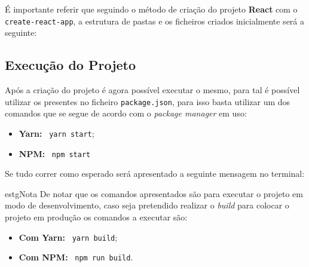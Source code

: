 É importante referir que seguindo o método de criação do projeto \textbf{React} com o \texttt{create-react-app}, a estrutura de pastas e os ficheiros criados inicialmente será a seguinte:



\subsection{Execução do Projeto}

Após a criação do projeto é agora possível executar o mesmo, para tal é possível utilizar os \textit{} presentes no ficheiro \texttt{package.json}, para isso basta utilizar um dos comandos que se segue de acordo com o \textit{package manager} em uso:

\begin{itemize}
	\item \textbf{Yarn:} ~\texttt{yarn start};
	\item \textbf{NPM:} ~\texttt{npm start}
\end{itemize}

Se tudo correr como esperado será apresentado a seguinte mensagem no terminal:


\begin{mybox}{estg}{Nota}
	De notar que os comandos apresentados são para executar o projeto em modo de desenvolvimento, caso seja pretendido realizar o \textit{build} para colocar o projeto em produção os comandos a executar são:

	\begin{itemize}
		\item \textbf{Com Yarn:} ~\texttt{yarn build};
		\item \textbf{Com NPM:} ~\texttt{npm run build}.
	\end{itemize}
\end{mybox}